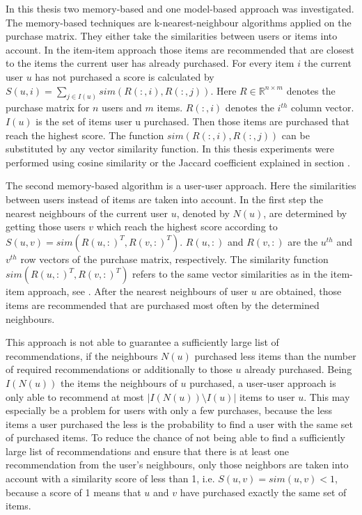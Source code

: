 \documentclass[10pt]{reportMaster}
\begin{document}
In this thesis two memory-based and one model-based approach was investigated.
The memory-based techniques are k-nearest-neighbour algorithms applied on the purchase matrix.
They either take the similarities between users or items into account. %
In the item-item approach those items are recommended that are closest to the items the current user has already purchased.
For every item $i$ the current user $u$ has not purchased a score is calculated by $S(u,i) = \sum_{j \in I(u)}{sim(R(:,i), R(:,j))}$. Here $R \in \mathds{R}^{n \times m}$ denotes the purchase matrix for $n$ users and $m$ items. $R(:,i)$ denotes the $i^{th}$ column vector. $I(u)$ is the set of items user u purchased.
Then those items are purchased that reach the highest score. %
The function $sim(R(:,i), R(:,j))$ can be substituted by any vector similarity function.
In this thesis experiments were performed using cosine similarity or the Jaccard coefficient explained in section . %

The second memory-based algorithm is a user-user approach.
Here the similarities between users instead of items are taken into account.
In the first step the nearest neighbours of the current user $u$, denoted by $N(u)$, are determined by getting those users $v$ which reach the highest score according to $S(u,v) = sim(R(u,:)^T, R(v, :)^T)$.
$R(u,:)$ and $R(v,:)$ are the $u^{th}$ and $v^{th}$ row vectors of the purchase matrix, respectively.
The similarity function $sim(R(u,:)^T, R(v, :)^T)$ refers to the same vector similarities as in the item-item approach, see . %
After the nearest neighbours of user $u$ are obtained, those items are recommended that are purchased most often by the determined neighbours. %

This approach is not able to guarantee a sufficiently large list of recommendations, if the neighbours $N(u)$ purchased less items than the number of required recommendations or additionally to those $u$ already purchased.
Being $I(N(u))$ the items the neighbours of $u$ purchased, a user-user approach is only able to recommend at most $|I(N(u)) \setminus I(u)|$ items to user $u$.
This may especially be a problem for users with only a few purchases, because the less items a user purchased the less is the probability to find a user with the same set of purchased items.
To reduce the chance of not being able to find a sufficiently large list of recommendations and ensure that there is at least one recommendation from the user's neighbours, only those neighbors are taken into account with a similarity score of less than 1, i.e. $S(u,v) = sim(u, v) < 1$, because a score of 1 means that $u$ and $v$ have purchased exactly the same set of items.
\end{document}
